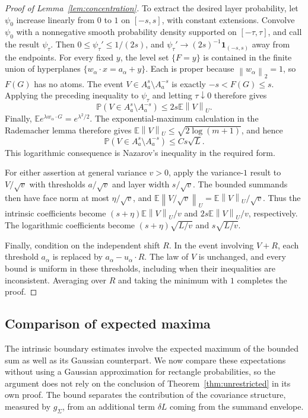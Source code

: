 \documentclass[11pt,letterpaper]{article}
\theoremstyle{remark}
\newcommand{\E}{\mathbb E}
\newcommand{\Pp}{\mathbb P}
\newcommand{\norm}[1]{\left\lVert#1\right\rVert}
\newcommand{\ind}{\mathbf 1}
\begin{document}
\begin{proof}[Proof of Lemma~\ref{lem:concentration}]
To extract the desired layer probability, let $\psi_0$ increase
linearly from $0$ to $1$ on $[-s,s]$, with constant extensions.
Convolve $\psi_0$ with a nonnegative smooth probability density
supported on $[-\tau,\tau]$, and call the result $\psi_\tau$.
Then $0\le\psi_\tau'\le1/(2s)$, and
$\psi_\tau'\to(2s)^{-1}\ind_{(-s,s)}$ away from the endpoints.
For every fixed $y$, the level set $\{F=y\}$ is contained in
the finite union of hyperplanes
$\{w_\alpha\cdot x=a_\alpha+y\}$. Each is proper because
$\norm{w_\alpha}_2=1$, so $F(G)$ has no atoms.
The event $V\in A_a^s\setminus A_a^{-s}$ is exactly
$-s<F(G)\le s$. Applying the preceding inequality to $\psi_\tau$
and letting $\tau\downarrow0$ therefore gives
\[
 \Pp(V\in A_a^s\setminus A_a^{-s})
 \le2s\E\norm V_U.
\]
Finally,
$\E e^{\lambda w_\alpha\cdot G}=e^{\lambda^2/2}$.
The exponential-maximum calculation in the Rademacher lemma
therefore gives $\E\norm V_U\le\sqrt{2\log(m+1)}$, and hence
\[
 \Pp(V\in A_a^s\setminus A_a^{-s})\le Cs\sqrt L.
\]
This logarithmic consequence is Nazarov's inequality
\cite{Nazarov2003,CCK17N} in the required form.

For either assertion at general variance $v>0$, apply the
variance-$1$ result to $V/\sqrt v$ with thresholds $a/\sqrt v$
and layer width $s/\sqrt v$. The bounded summands then have
face norm at most $\eta/\sqrt v$, and
$\E\norm{V/\sqrt v}_U=\E\norm V_U/\sqrt v$.
Thus the intrinsic coefficients become
$(s+\eta)\E\norm V_U/v$ and $2s\E\norm V_U/v$, respectively.
The logarithmic coefficients become
$(s+\eta)\sqrt{L/v}$ and $s\sqrt{L/v}$.

Finally, condition on the independent shift $R$.
In the event involving $V+R$, each threshold $a_\alpha$ is
replaced by $a_\alpha-u_\alpha\cdot R$.
The law of $V$ is unchanged, and every bound is uniform in these
thresholds, including when their inequalities are inconsistent.
Averaging over $R$ and taking the minimum with $1$ completes
the proof.
\end{proof}

\subsection{Comparison of expected maxima}

The intrinsic boundary estimates involve the expected maximum of
the bounded sum as well as its Gaussian counterpart. We now compare
these expectations without using a Gaussian approximation for
rectangle probabilities, so the argument does not rely on the
conclusion of Theorem~\ref{thm:unrestricted} in its own proof.
The bound separates the contribution of the covariance structure,
measured by $g_\Sigma$, from an additional term $\delta L$
coming from the summand envelope.
\end{document}
